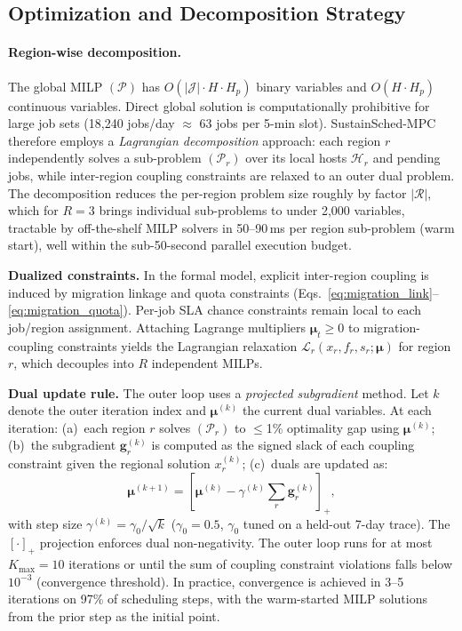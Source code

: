 \documentclass[a4paper,fleqn]{cas-dc}
\begin{document}
\subsection{Optimization and Decomposition Strategy}
\label{sec:opt_strategy}

\paragraph{Region-wise decomposition.}
The global MILP $(\mathcal{P})$ has $O(|\mathcal{J}| \cdot H \cdot H_p)$ binary variables and $O(H \cdot H_p)$ continuous variables. Direct global solution is computationally prohibitive for large job sets (18,240 jobs/day $\approx$ 63 jobs per 5-min slot). SustainSched-MPC therefore employs a \emph{Lagrangian decomposition} approach: each region $r$ independently solves a sub-problem $(\mathcal{P}_r)$ over its local hosts $\mathcal{H}_r$ and pending jobs, while inter-region coupling constraints are relaxed to an outer dual problem. The decomposition reduces the per-region problem size roughly by factor $|\mathcal{R}|$, which for $R=3$ brings individual sub-problems to under 2,000 variables, tractable by off-the-shelf MILP solvers in 50--90\,ms per region sub-problem (warm start), well within the sub-50-second parallel execution budget.

\textbf{Dualized constraints.} In the formal model, explicit inter-region coupling is induced by migration linkage and quota constraints (Eqs.~\eqref{eq:migration_link}--\eqref{eq:migration_quota}). Per-job SLA chance constraints remain local to each job/region assignment. Attaching Lagrange multipliers $\boldsymbol{\mu}_t \geq 0$ to migration-coupling constraints yields the Lagrangian relaxation $\mathcal{L}_r(x_r, f_r, s_r; \boldsymbol{\mu})$ for region $r$, which decouples into $R$ independent MILPs.

\textbf{Dual update rule.} The outer loop uses a \emph{projected subgradient} method. Let $k$ denote the outer iteration index and $\boldsymbol{\mu}^{(k)}$ the current dual variables. At each iteration: (a)~each region $r$ solves $(\mathcal{P}_r)$ to $\leq$1\% optimality gap using $\boldsymbol{\mu}^{(k)}$; (b)~the subgradient $\mathbf{g}^{(k)}_r$ is computed as the signed slack of each coupling constraint given the regional solution $x^{(k)}_r$; (c)~duals are updated as:
\begin{equation}
\boldsymbol{\mu}^{(k+1)} = \left[\boldsymbol{\mu}^{(k)} - \gamma^{(k)} \sum_r \mathbf{g}^{(k)}_r \right]_+,
\end{equation}
with step size $\gamma^{(k)} = \gamma_0 / \sqrt{k}$ ($\gamma_0 = 0.5$, $\gamma_0$ tuned on a held-out 7-day trace). The $[\cdot]_+$ projection enforces dual non-negativity. The outer loop runs for at most $K_{\max}=10$ iterations or until the sum of coupling constraint violations falls below $10^{-3}$ (convergence threshold). In practice, convergence is achieved in 3--5 iterations on 97\% of scheduling steps, with the warm-started MILP solutions from the prior step as the initial point.
\end{document}
